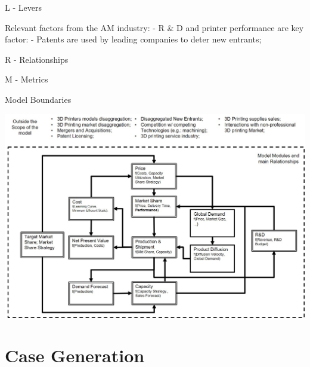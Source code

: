 \documentclass[12pt,ignorenonframetext,]{beamer}
\begin{document}
\begin{frame}{L - Levers}
\protect\hypertarget{l---levers-1}{}

Relevant factors from the AM industry: - R \& D and printer performance
are key factor: - Patents are used by leading companies to deter new
entrants;

\end{frame}

\begin{frame}{R - Relationships}
\protect\hypertarget{r---relationships}{}

\end{frame}

\begin{frame}{M - Metrics}
\protect\hypertarget{m---metrics}{}

\end{frame}

\begin{frame}{Model Boundaries}
\protect\hypertarget{model-boundaries}{}

\includegraphics{images/model-modules-and-boundaries.jpg}

\end{frame}

\hypertarget{case-generation}{%
\section{Case Generation}\label{case-generation}}
\end{document}

